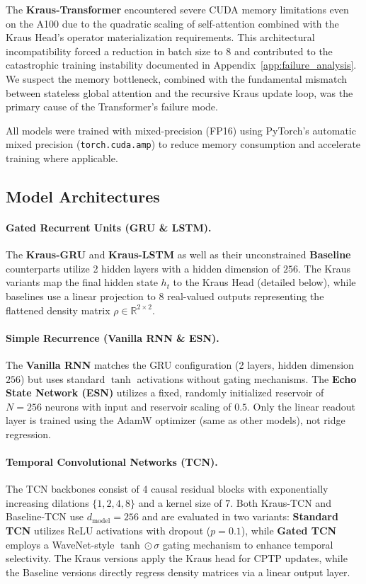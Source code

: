 \documentclass{article} %
\begin{document}
The \textbf{Kraus-Transformer} encountered severe CUDA memory limitations even on the A100 due to the quadratic scaling of self-attention combined with the Kraus Head's operator materialization requirements. This architectural incompatibility forced a reduction in batch size to 8 and contributed to the catastrophic training instability documented in Appendix~\ref{app:failure_analysis}. We suspect the memory bottleneck, combined with the fundamental mismatch between stateless global attention and the recursive Kraus update loop, was the primary cause of the Transformer's failure mode.

All models were trained with mixed-precision (FP16) using PyTorch's automatic mixed precision (\texttt{torch.cuda.amp}) to reduce memory consumption and accelerate training where applicable.

\subsection{Model Architectures}



\paragraph{Gated Recurrent Units (GRU \& LSTM).}
The \textbf{Kraus-GRU} and \textbf{Kraus-LSTM} as well as their unconstrained \textbf{Baseline} counterparts utilize 2 hidden layers with a hidden dimension of $256$. The Kraus variants map the final hidden state $h_t$ to the Kraus Head (detailed below), while baselines use a linear projection to 8 real-valued outputs representing the flattened density matrix $\rho \in \mathbb{R}^{2 \times 2}$.

\paragraph{Simple Recurrence (Vanilla RNN \& ESN).}
The \textbf{Vanilla RNN} matches the GRU configuration (2 layers, hidden dimension $256$) but uses standard $\tanh$ activations without gating mechanisms. The \textbf{Echo State Network (ESN)} utilizes a fixed, randomly initialized reservoir of $N=256$ neurons with input and reservoir scaling of $0.5$. Only the linear readout layer is trained using the AdamW optimizer (same as other models), not ridge regression.

\paragraph{Temporal Convolutional Networks (TCN).}
The TCN backbones consist of 4 causal residual blocks with exponentially increasing dilations $\{1, 2, 4, 8\}$ and a kernel size of $7$. Both Kraus-TCN and Baseline-TCN use $d_{\text{model}}=256$ and are evaluated in two variants: \textbf{Standard TCN} utilizes ReLU activations with dropout ($p=0.1$), while \textbf{Gated TCN} employs a WaveNet-style $\tanh \odot \sigma$ gating mechanism to enhance temporal selectivity. The Kraus versions apply the Kraus head for CPTP updates, while the Baseline versions directly regress density matrices via a linear output layer.
\end{document}
